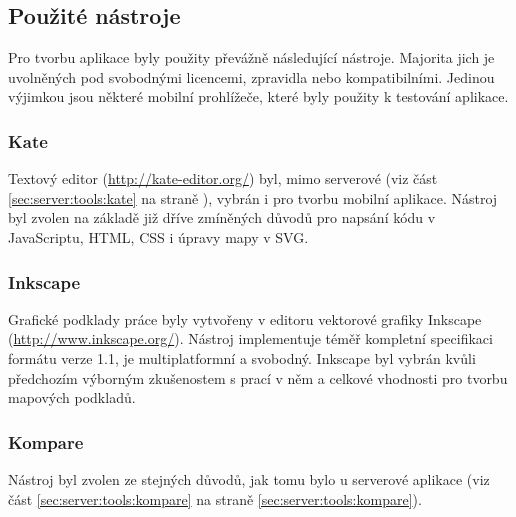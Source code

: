 \subsection{Použité nástroje}
Pro tvorbu aplikace byly použity převážně následující nástroje. Majorita jich je uvolněných pod svobodnými licencemi, zpravidla   nebo kompatibilními. Jedinou výjimkou jsou některé mobilní prohlížeče, které byly použity k testování aplikace.

\subsubsection{Kate}
Textový editor  (\url{http://kate-editor.org/}) byl, mimo serverové (viz část \ref{sec:server:tools:kate} na straně \pageref{sec:server:tools:kate}), vybrán i pro tvorbu mobilní aplikace. Nástroj byl zvolen na základě již dříve zmíněných důvodů pro napsání kódu v JavaScriptu, \gls{HTML}, \gls{CSS} i úpravy mapy v \gls{SVG}.

\subsubsection{Inkscape}
Grafické podklady práce byly vytvořeny v editoru vektorové grafiky Inkscape (\url{http://www.inkscape.org/}). Nástroj implementuje téměř kompletní specifikaci formátu  verze 1.1, je multiplatformní a svobodný. Inkscape byl vybrán kvůli předchozím výborným zkušenostem s prací v něm a celkové vhodnosti pro tvorbu mapových podkladů.

\subsubsection{Kompare}
Nástroj byl zvolen ze stejných důvodů, jak tomu bylo u serverové aplikace (viz část \ref{sec:server:tools:kompare} na straně \ref{sec:server:tools:kompare}).

